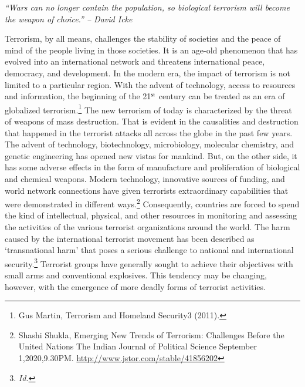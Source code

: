 \setcounter{figure}{0}
\setcounter{table}{0}
\setcounter{footnote}{0}


\label{2020-art6}

\begin{multicols}{2}

\noi
\textit{“Wars can no longer contain the population, so biological terrorism will become the
weapon of choice.” -- David Icke}


\noi
Terrorism, by all means, challenges the stability of societies and the peace of mind of the
people living in those societies. It is an age-old phenomenon that has evolved into an
international network and threatens international peace, democracy, and development. In the
modern era, the impact of terrorism is not limited to a particular region. With the advent of
technology, access to resources and information, the beginning of the 21$^{\rm st}$ century can be
treated as an era of globalized terrorism.\footnote{Gus Martin, Terrorism and Homeland Security3 (2011).}
 The new terrorism of today is characterized by the
threat of weapons of mass destruction. That is evident in the causalities and destruction that
happened in the terrorist attacks all across the globe in the past few years. The advent of
technology, biotechnology, microbiology, molecular chemistry, and genetic engineering has
opened new vistas for mankind. But, on the other side, it has some adverse effects in the form
of manufacture and proliferation of biological and chemical weapons. Modern technology,
innovative sources of funding, and world network connections have given terrorists
extraordinary capabilities that were demonstrated in different ways.\footnote{Shashi Shukla, Emerging New Trends of Terrorism: Challenges Before the United Nations The Indian Journal
of Political Science September 1,2020,9.30PM. \url{http://www.jstor.com/stable/41856202}}
 Consequently, countries
are forced to spend the kind of intellectual, physical, and other resources in monitoring and
assessing the activities of the various terrorist organizations around the world. The harm
caused by the international terrorist movement has been described as ‘transnational harm' that
poses a serious challenge to national and international security.\footnote{\textit{Id.}}
Terrorist groups have
generally sought to achieve their objectives with small arms and conventional explosives.
This tendency may be changing, however, with the emergence of more deadly forms of
terrorist activities. 


\end{multicols}
